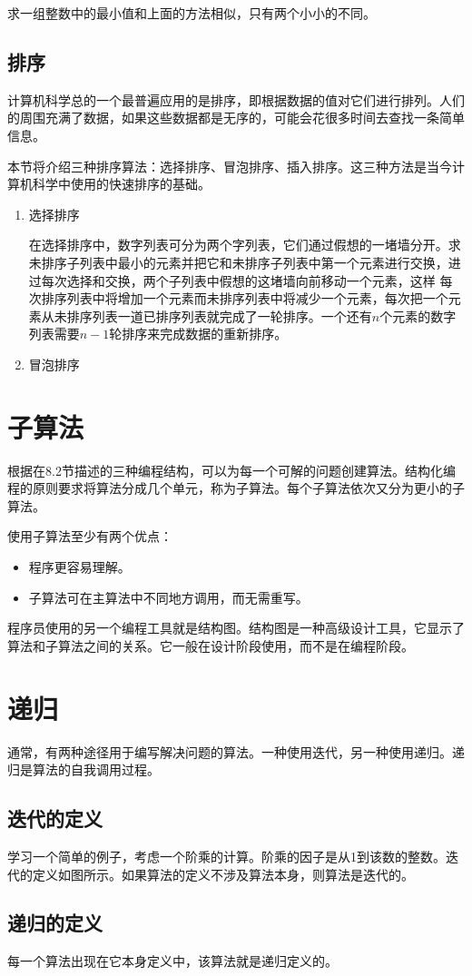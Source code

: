 求一组整数中的最小值和上面的方法相似，只有两个小小的不同。
\subsection{排序}
计算机科学总的一个最普遍应用的是排序，即根据数据的值对它们进行排列。人们的周围充满了数据，如果这些数据都是无序的，可能会花很多时间去查找一条简单信息。

本节将介绍三种排序算法：选择排序、冒泡排序、插入排序。这三种方法是当今计算机科学中使用的快速排序的基础。
\begin{enumerate}
	\item 选择排序

	在选择排序中，数字列表可分为两个字列表，它们通过假想的一堵墙分开。求未排序子列表中最小的元素并把它和未排序子列表中第一个元素进行交换，进过每次选择和交换，两个子列表中假想的这堵墙向前移动一个元素，这样 每次排序列表中将增加一个元素而未排序列表中将减少一个元素，每次把一个元素从未排序列表一道已排序列表就完成了一轮排序。一个还有$n$个元素的数字列表需要$n-1$轮排序来完成数据的重新排序。
	\item 冒泡排序
\end{enumerate}
\section{子算法}
	根据在8.2节描述的三种编程结构，可以为每一个可解的问题创建算法。结构化编程的原则要求将算法分成几个单元，称为子算法。每个子算法依次又分为更小的子算法。

使用子算法至少有两个优点：
\begin{itemize}
		\item 程序更容易理解。
		\item 子算法可在主算法中不同地方调用，而无需重写。
\end{itemize}

程序员使用的另一个编程工具就是结构图。结构图是一种高级设计工具，它显示了算法和子算法之间的关系。它一般在设计阶段使用，而不是在编程阶段。
\section{递归}
通常，有两种途径用于编写解决问题的算法。一种使用迭代，另一种使用递归。递归是算法的自我调用过程。
\subsection{迭代的定义}
学习一个简单的例子，考虑一个阶乘的计算。阶乘的因子是从1到该数的整数。迭代的定义如图所示。如果算法的定义不涉及算法本身，则算法是迭代的。
\subsection{递归的定义}
每一个算法出现在它本身定义中，该算法就是递归定义的。
